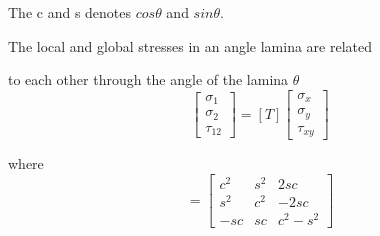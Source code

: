 \documentclass[Afour,sagev,times]{sagej}
\begin{document}
The c and s denotes $cos\theta $ and $sin\theta $.

The local and global stresses in an angle lamina are related

to each other through the angle of the lamina $\theta $
\begin{equation}\left[\begin{array}{l}\sigma _{1} \\ \sigma _{2} \\ \tau_{12}\end{array}\right]=[T]\left[\begin{array}{l}\sigma _{x} \\ \sigma _{y} \\\tau_{xy}\end{array}\right]
\end{equation}

where
\begin{equation}[T]=\left[\begin{array}{ccc}c^{2} & s^{2} & 2 s c \\ s^{2} & c^{2} & -2 s c \\ -s c & s c &c^{2}-s^{2}\end{array}\right] 
\end{equation}
\end{document}
